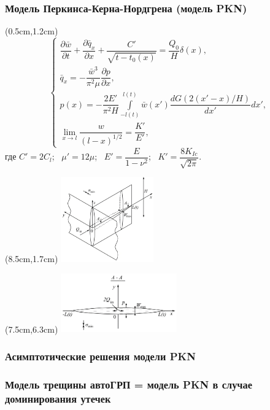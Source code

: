 \documentclass{beamer}
\begin{document}
\begin{frame}
\frametitle{Модель Перкинса-Керна-Нордгрена (модель PKN)}

\begin{textblock*}{7cm}(0.5cm,1.2cm)
$$
\begin{cases}
\dfrac{\partial\bar{w}}{\partial t}+\dfrac{\partial\bar{q}_x}{\partial x}+\dfrac{C'}{\sqrt{t-t_0(x)}}=\dfrac{Q_0}{H}\delta(x),\\[15pt]
\bar{q}_x=-\dfrac{\bar{w}^3}{\pi^2\mu}\dfrac{\partial p}{\partial x},\\[15pt]
p(x)=-\dfrac{2E'}{\pi^2H}\displaystyle\int\limits_{-l(t)}^{l(t)}\bar{w}(x')\dfrac{dG(2(x'-x)/H)}{dx'}dx',\\[22pt]
\displaystyle\lim_{x\to l}\dfrac{w}{(l-x)^{1/2}}=\dfrac{K'}{E'},
\end{cases}
$$
где $C'=2C_l$; $\,\,\,\mu'=12\mu$; $\,\,\,E'=\dfrac{E}{1-\nu^2}$; $\,\,\,K'=\dfrac{8K_{Ic}}{\sqrt{2\pi}}$.
\end{textblock*}

\begin{textblock*}{7cm}(8.5cm,1.7cm)
\includegraphics[width=4cm]{pkn_model_3D.jpg}
\end{textblock*}

\begin{textblock*}{7cm}(7.5cm,6.3cm)
\includegraphics[width=5cm]{pkn_model_A-A_plane.jpg}
\end{textblock*}


\end{frame}


\begin{frame}
\frametitle{Асимптотические решения модели PKN}

\end{frame}


\begin{frame}
\frametitle{Модель трещины автоГРП = модель PKN в случае доминирования утечек}

\end{frame}
\end{document}
